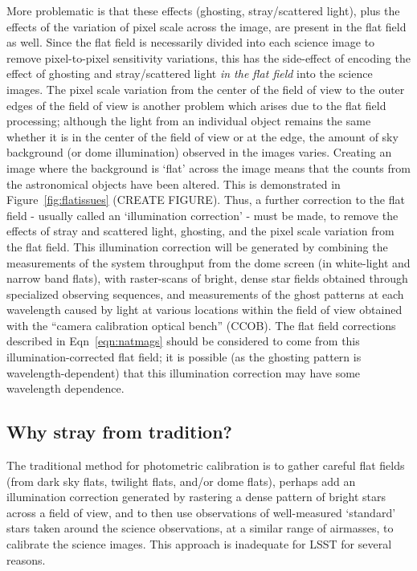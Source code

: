 \documentclass[12pt,preprint]{aastex}
\begin{document}
More problematic is that these effects (ghosting, stray/scattered
light), plus the effects of the variation of pixel scale across the
image, are present in the flat field as well. Since the flat field is
necessarily divided into each science image to remove pixel-to-pixel
sensitivity variations, this has the side-effect of encoding the
effect of ghosting and stray/scattered light {\it in the flat field}
into the science images. The pixel scale variation from the center of
the field of view to the outer edges of the field of view is another
problem which arises due to the flat field processing; although the
light from an individual object remains the same whether it is in the
center of the field of view or at the edge, the amount of sky
background (or dome illumination) observed in the images varies.
Creating an image where the background is `flat' across the image
means that the counts from the astronomical objects have been altered.
This is demonstrated in Figure~\ref{fig:flatissues} (CREATE
FIGURE). Thus, a further correction to the flat field - usually called
an `illumination correction' - must be made, to remove the effects of
stray and scattered light, ghosting, and the pixel scale variation
from the flat field. This illumination correction will be generated by
combining the measurements of the system throughput from the dome
screen (in white-light and narrow band flats), with raster-scans of
bright, dense star fields obtained through specialized observing
sequences, and measurements of the ghost patterns at each wavelength
caused by light at various locations within the field of view obtained
with the ``camera calibration optical bench'' (CCOB).  The flat field
corrections described in Eqn~\ref{eqn:natmags} should be considered to
come from this illumination-corrected flat field; it is possible (as
the ghosting pattern is wavelength-dependent) that this illumination
correction may have some wavelength dependence. 
 
\subsection{Why stray from tradition?}

The traditional method for photometric calibration is to gather
careful flat fields (from dark sky flats, twilight flats, and/or dome
flats), perhaps add an illumination correction generated by rastering
a dense pattern of bright stars across a field of view, and to then use
observations of well-measured `standard' stars taken around the
science observations, at a similar range of airmasses, to calibrate
the science images. This approach is inadequate for LSST for several
reasons. 
\end{document}
